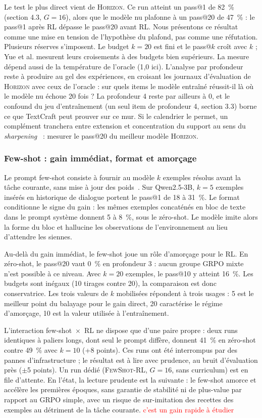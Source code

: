 \documentclass[11pt,a4paper]{article}
\begin{document}
Le test le plus direct vient de \textsc{Horizon}. Ce run atteint un pass@1 de 82~\% (section 4.3, $G=16$), alors que le modèle nu plafonne à un pass@20 de 47~\% : le pass@1 après RL dépasse le pass@20 avant RL. Nous présentons ce résultat comme une mise en tension de l'hypothèse du plafond, pas comme une réfutation. Plusieurs réserves s'imposent. Le budget $k=20$ est fini et le pass@$k$ croît avec $k$ ; Yue et al. mesurent leurs croisements à des budgets bien supérieurs. La mesure dépend aussi de la température de l'oracle (1{,}0 ici). L'analyse par profondeur reste à produire au gel des expériences, en croisant les journaux d'évaluation de \textsc{Horizon} avec ceux de l'oracle : sur quels items le modèle entraîné réussit-il là où le modèle nu échoue 20 fois ? La profondeur 4 reste par ailleurs à 0, et le confound du jeu d'entraînement (un seul item de profondeur 4, section 3.3) borne ce que TextCraft peut prouver sur ce mur. Si le calendrier le permet, un complément tranchera entre extension et concentration du support au sens du \emph{sharpening}~\cite{huang2024self} : mesurer le pass@20 du meilleur modèle \textsc{Horizon}.

\subsubsection{Few-shot : gain immédiat, format et amorçage}

Le prompt few-shot consiste à fournir au modèle $k$ exemples résolus avant la tâche courante, sans mise à jour des poids~\cite{brown2020gpt3}. Sur Qwen2.5-3B, $k=5$ exemples insérés en historique de dialogue portent le pass@1 de 18 à 31~\%. Le format conditionne le signe du gain : les mêmes exemples concaténés en bloc de texte dans le prompt système donnent 5 à 8~\%, sous le zéro-shot. Le modèle imite alors la forme du bloc et hallucine les observations de l'environnement au lieu d'attendre les siennes.

Au-delà du gain immédiat, le few-shot joue un rôle d'amorçage pour le RL. En zéro-shot, le pass@20 vaut 0~\% en profondeur 3 : aucun groupe GRPO mixte n'est possible à ce niveau. Avec $k=20$ exemples, le pass@10 y atteint 16~\%. Les budgets sont inégaux (10 tirages contre 20), la comparaison est donc conservatrice. Les trois valeurs de $k$ mobilisées répondent à trois usages : 5 est le meilleur point du balayage pour le gain direct, 20 caractérise le régime d'amorçage, 10 est la valeur utilisée à l'entraînement.

L'interaction few-shot~$\times$~RL ne dispose que d'une paire propre : deux runs identiques à paliers longs, dont seul le prompt diffère, donnent 41~\% en zéro-shot contre 49~\% avec $k=10$ (+8 points). Ces runs ont été interrompus par des pannes d'infrastructure ; le résultat est à lire avec prudence, au bruit d'évaluation près ($\pm$5 points). Un run dédié (\textsc{FewShot-RL}, $G=16$, sans curriculum) est en file d'attente. En l'état, la lecture prudente est la suivante : le few-shot amorce et accélère les premières époques, sans garantie de stabilité ni de plus-value par rapport au GRPO simple, avec un risque de sur-imitation des recettes des exemples au détriment de la tâche courante. \textcolor{red}{c'est un gain rapide à étudier }
\end{document}
